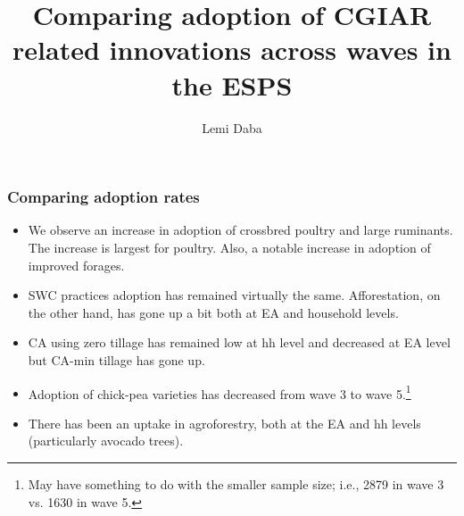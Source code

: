 \documentclass[11pt]{beamer}
\begin{document}
\author{Lemi Daba}
\title{Comparing adoption of CGIAR related innovations across waves in the ESPS}
\begin{frame}[plain]
	\maketitle
\end{frame}

\begin{frame}
\label{frstpg}
\frametitle{Comparing adoption rates}
\begin{itemize}
\item We observe an increase in adoption of crossbred poultry and large ruminants. The increase is largest for poultry. Also, a notable increase in adoption of improved forages.\hyperlink{animaldynplt}{}

\item SWC practices adoption has remained virtually the same. Afforestation, on the other hand, has gone up a bit both at EA and household levels. \hyperlink{swcaffdynplt}{}

\item CA using zero tillage has remained low at hh level and decreased at EA level but CA-min tillage has gone up. \hyperlink{cadynplt}{}

\item Adoption of chick-pea varieties has decreased from wave 3 to wave 5.\footnote{May have something to do with the smaller sample size; i.e., 2879 in wave 3 vs. 1630 in wave 5.}  \hyperlink{kabulidynplt}{}

\item There has been an uptake in agroforestry, both at the EA and hh levels (particularly avocado trees). \hyperlink{agroforestdynplt}{}

\end{itemize}

\end{frame}
\end{document}
